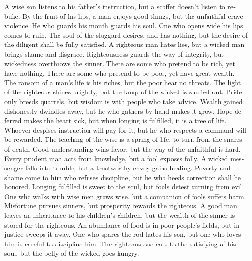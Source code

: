 \begin{paracol}{2}
\begin{otherlanguage}{english}
 A wise son listens to his father's instruction, but a
scoffer doesn't listen to rebuke.  By the fruit of his
lips, a man enjoys good things, but the unfaithful crave violence.
 He who guards his mouth guards his soul. One who opens
wide his lips comes to ruin.  The soul of the sluggard
desires, and has nothing, but the desire of the diligent shall be fully
satisfied.  A righteous man hates lies, but a wicked man
brings shame and disgrace.  Righteousness guards the way
of integrity, but wickedness overthrows the sinner.  There
are some who pretend to be rich, yet have nothing. There are some who
pretend to be poor, yet have great wealth.  The ransom of
a man's life is his riches, but the poor hear no threats. 
The light of the righteous shines brightly, but the lamp of the wicked
is snuffed out.  Pride only breeds quarrels, but wisdom
is with people who take advice.  Wealth gained
dishonestly dwindles away, but he who gathers by hand makes it grow.
 Hope deferred makes the heart sick, but when longing is
fulfilled, it is a tree of life.  Whoever despises
instruction will pay for it, but he who respects a command will be
rewarded.  The teaching of the wise is a spring of life,
to turn from the snares of death.  Good understanding
wins favor, but the way of the unfaithful is hard.  Every
prudent man acts from knowledge, but a fool exposes folly.
 A wicked messenger falls into trouble, but a trustworthy
envoy gains healing.  Poverty and shame come to him who
refuses discipline, but he who heeds correction shall be honored.
 Longing fulfilled is sweet to the soul, but fools detest
turning from evil.  One who walks with wise men grows
wise, but a companion of fools suffers harm.  Misfortune
pursues sinners, but prosperity rewards the righteous.  A
good man leaves an inheritance to his children's children, but the
wealth of the sinner is stored for the righteous.  An
abundance of food is in poor people's fields, but injustice sweeps it
away.  One who spares the rod hates his son, but one who
loves him is careful to discipline him.  The righteous
one eats to the satisfying of his soul, but the belly of the wicked goes
hungry.

\end{otherlanguage}


\end{paracol}
